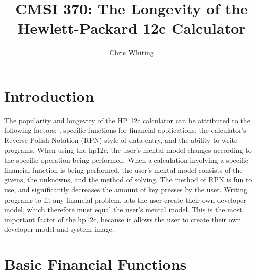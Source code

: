 \documentclass{article}
\title{CMSI 370: The Longevity of the Hewlett-Packard 12c Calculator}
\author{Chris Whiting}
\date{}
\begin{document}
\maketitle


\pagebreak
\tableofcontents

\pagebreak

%
%
\section{Introduction}
\label{introduction}

The popularity and longevity of the HP 12c calculator can be attributed to the following factors: , specific functions for financial applications, the calculator's Reverse Polish Notation (RPN) style of data entry, and the ability to write programs. When using the hp12c, the user's mental model changes according to the specific operation being performed. When a calculation involving a specific financial function is being performed, the user's mental model consists of the givens, the unknowns, and the method of solving. The method of RPN is fun to use, and significantly decreases the amount of key presses by the user. Writing programs to fit any financial problem, lets the user create their own developer model, which therefore must equal the user's mental model. This is the most important factor of the hp12c, because it allows the user to create their own developer model and system image.


\section{Basic Financial Functions}
\end{document}
